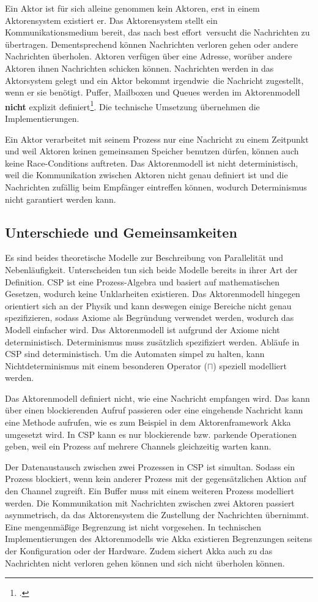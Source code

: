 Ein Aktor ist für sich alleine genommen kein Aktoren, erst in einem Aktorensystem existiert er. Das Aktorensystem stellt ein Kommunikationsmedium bereit, das nach \glqq best effort\grqq\ versucht die Nachrichten zu übertragen. Dementsprechend können Nachrichten verloren gehen oder andere Nachrichten überholen. Aktoren verfügen über eine Adresse, worüber andere Aktoren ihnen Nachrichten schicken können. Nachrichten werden in das Aktorsystem gelegt und ein Aktor bekommt \glqq irgendwie\grqq\ die Nachricht zugestellt, wenn er sie benötigt. Puffer, Mailboxen und Queues werden im Aktorenmodell \textbf{nicht} explizit definiert\footcite[Seite 3, Rechte Spalte]{ACTORSNEW}. Die technische Umsetzung übernehmen die Implementierungen.

Ein Aktor verarbeitet mit seinem Prozess nur eine Nachricht zu einem Zeitpunkt und weil Aktoren keinen gemeinsamen Speicher benutzen dürfen, können auch keine Race-Conditions auftreten.
Das Aktorenmodell ist nicht deterministisch, weil die Kommunikation zwischen Aktoren nicht genau definiert ist und die Nachrichten zufällig beim Empfänger eintreffen können, wodurch Determinismus nicht garantiert werden kann.

\subsection{Unterschiede und Gemeinsamkeiten}
Es sind beides theoretische Modelle zur Beschreibung von Parallelität und Nebenläufigkeit. 
Unterscheiden tun sich beide Modelle bereits in ihrer Art der Definition. \ac{CSP} ist eine Prozess-Algebra und basiert auf mathematischen Gesetzen, wodurch keine Unklarheiten existieren. Das Aktorenmodell hingegen orientiert sich an der Physik und kann deswegen einige Bereiche nicht genau spezifizieren, sodass Axiome als Begründung verwendet werden, wodurch das Modell einfacher wird. Das Aktorenmodell ist aufgrund der Axiome nicht deterministisch. Determinismus muss zusätzlich spezifiziert werden. Abläufe in \ac{CSP} sind deterministisch. Um die Automaten simpel zu halten, kann Nichtdeterminismus mit einem besonderen Operator ($\sqcap$) speziell modelliert werden.

Das Aktorenmodell definiert nicht, wie eine Nachricht empfangen wird. Das kann über einen blockierenden Aufruf passieren oder eine eingehende Nachricht kann eine Methode aufrufen, wie es zum Beispiel in dem Aktorenframework Akka umgesetzt wird. In \ac{CSP} kann es nur blockierende bzw. parkende Operationen geben, weil ein Prozess auf mehrere Channels gleichzeitig warten kann.

Der Datenaustausch zwischen zwei Prozessen in \ac{CSP} ist simultan. Sodass ein Prozess blockiert, wenn kein anderer Prozess mit der gegensätzlichen Aktion auf den Channel zugreift. Ein Buffer muss mit einem weiteren Prozess modelliert werden. Die Kommunikation mit Nachrichten zwischen zwei Aktoren passiert asymmetrisch, da das Aktorensystem die Zustellung der Nachrichten übernimmt. Eine mengenmäßige Begrenzung ist nicht vorgesehen. In technischen Implementierungen des Aktorenmodells wie Akka existieren Begrenzungen seitens der Konfiguration oder der Hardware. Zudem sichert Akka auch zu das Nachrichten nicht verloren gehen können und sich nicht überholen können.
